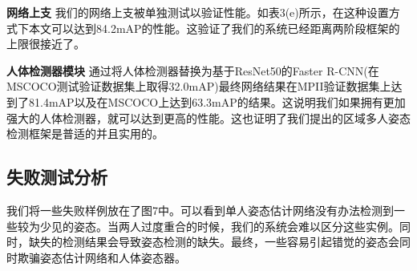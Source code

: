 \textbf{网络上支} 我们的网络上支被单独测试以验证性能。如表3(e)所示，在这种设置方式下本文可以达到84.2mAP的性能。这验证了我们的系统已经距离两阶段框架的上限很接近了。

\textbf{人体检测器模块} 通过将人体检测器替换为基于ResNet50的Faster R-CNN(在MSCOCO测试验证数据集上取得32.0mAP)最终网络结果在MPII验证数据集上达到了81.4mAP以及在MSCOCO上达到63.3mAP的结果。这说明我们如果拥有更加强大的人体检测器，就可以达到更高的性能。这也证明了我们提出的区域多人姿态检测框架是普适的并且实用的。

\subsection{失败测试分析}
我们将一些失败样例放在了图7中。可以看到单人姿态估计网络没有办法检测到一些较为少见的姿态。当两人过度重合的时候，我们的系统会难以区分这些实例。同时，缺失的检测结果会导致姿态检测的缺失。最终，一些容易引起错觉的姿态会同时欺骗姿态估计网络和人体姿态器。

